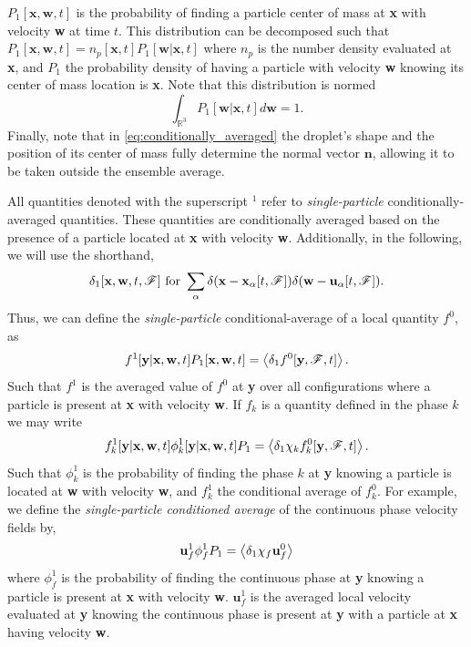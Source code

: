 $P_1[\textbf{x},\textbf{w},t]$ is the probability of finding a particle center of mass at \textbf{x} with velocity \textbf{w} at time $t$.
This distribution can be decomposed such that $P_1[\textbf{x},\textbf{w},t] = n_p[\textbf{x},t] P_1[\textbf{w}|\textbf{x},t]$ where $n_p$ is the number density evaluated at \textbf{x}, and $P_1$ the probability density of having a particle with velocity \textbf{w} knowing its center of mass location is \textbf{x}. 
Note that this distribution is normed 
\begin{equation*}
    \int_{\mathbb{R}^3} P_1[\textbf{w}|\textbf{x},t] d \textbf{w} = 1. 
\end{equation*}
Finally, note that in \ref{eq:conditionally_averaged} the droplet's shape and the position of its center of mass fully determine the normal vector $\textbf{n}$, allowing it to be taken outside the ensemble average. 

All quantities denoted with the superscript $^1$ refer to \textit{single-particle} conditionally-averaged quantities. 
These quantities are conditionally averaged based on the presence of a particle located at \textbf{x} with velocity \textbf{w}.
Additionally, in the following, we will use the shorthand,
\begin{equation}
    \delta_1[\textbf{x},\textbf{w},t,\mathscr{F}]  \text{ for } \sum_\alpha \delta(\textbf{x} - \textbf{x}_\alpha[t,\mathscr{F}]) \delta(\textbf{w} - \textbf{u}_\alpha[t,\mathscr{F}]). 
\end{equation}  
Thus, we can define the \textit{single-particle} conditional-average of a local quantity $f^0$, as 
\begin{equation*}
    f^1[\textbf{y}|\textbf{x},\textbf{w},t] P_1[\textbf{x},\textbf{w},t] = \left<\delta_1 f^0[\textbf{y},\mathscr{F},t]\right>.
\end{equation*}
Such that $f^1$ is the averaged value of $f^0$ at \textbf{y} over all configurations where a particle is present at \textbf{x} with velocity \textbf{w}. 
If $f_k$ is a quantity defined in the phase $k$ we may write 
\begin{equation*}
    f^1_k[\textbf{y}|\textbf{x},\textbf{w},t] \phi_k^1[\textbf{y}|\textbf{x},\textbf{w},t]  P_1 = \left<\delta_1 \chi_k f^0_k [\textbf{y},\mathscr{F},t]\right>.
\end{equation*}
Such that $\phi_k^1$ is the probability of finding the phase $k$ at \textbf{y} knowing a particle is located at \textbf{w} with velocity \textbf{w}, and $f_k^1$ the conditional average of $f_k^0$. 
For example, we define the \textit{single-particle conditioned average} of the continuous phase velocity fields by, 
\begin{equation*}
    \textbf{u}_f^1 \phi_f^1 P_1
    = \left<\delta_1 \chi_f \textbf{u}_f^0\right>
\end{equation*} 
where $\phi_f^1$ is the probability of finding the continuous phase at \textbf{y} knowing a particle is present at \textbf{x} with velocity \textbf{w}. 
$\textbf{u}_f^1$ is the averaged local velocity evaluated at \textbf{y} knowing the continuous phase is present at \textbf{y} with a particle at \textbf{x} having velocity \textbf{w}. 

